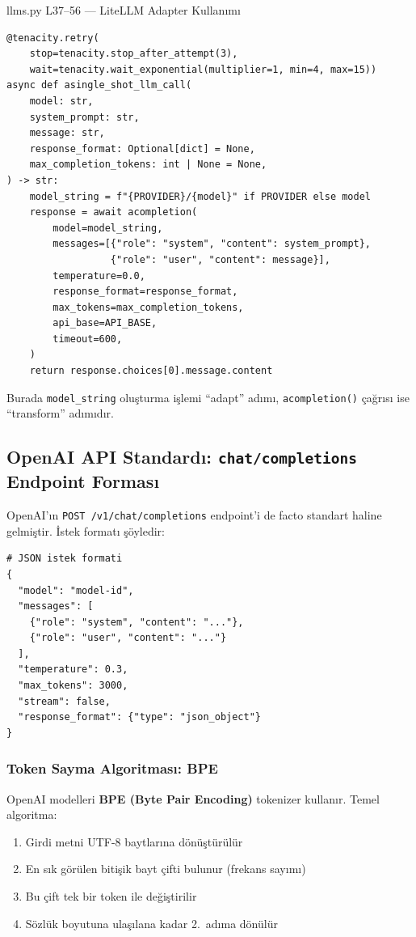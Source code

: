 \begin{kodref}{llms.py L37--56 --- LiteLLM Adapter Kullan{\i}m{\i}}
\begin{lstlisting}
@tenacity.retry(
    stop=tenacity.stop_after_attempt(3),
    wait=tenacity.wait_exponential(multiplier=1, min=4, max=15))
async def asingle_shot_llm_call(
    model: str,
    system_prompt: str,
    message: str,
    response_format: Optional[dict] = None,
    max_completion_tokens: int | None = None,
) -> str:
    model_string = f"{PROVIDER}/{model}" if PROVIDER else model
    response = await acompletion(
        model=model_string,
        messages=[{"role": "system", "content": system_prompt},
                  {"role": "user", "content": message}],
        temperature=0.0,
        response_format=response_format,
        max_tokens=max_completion_tokens,
        api_base=API_BASE,
        timeout=600,
    )
    return response.choices[0].message.content
\end{lstlisting}
\end{kodref}

Burada \texttt{model\_string} olu\c{s}turma i\c{s}lemi ``adapt'' ad{\i}m{\i}, \texttt{acompletion()} \c{c}a\u{g}r{\i}s{\i} ise ``transform'' ad{\i}m{\i}d{\i}r.


\subsection{OpenAI API Standard{\i}: \texttt{chat/completions} Endpoint Formas{\i}}
\label{sec:openai-api}

OpenAI'{\i}n \texttt{POST /v1/chat/completions} endpoint'i de facto standart haline gelmi\c{s}tir. \.{I}stek format{\i} \c{s}\"{o}yledir:

\begin{lstlisting}
# JSON istek formati
{
  "model": "model-id",
  "messages": [
    {"role": "system", "content": "..."},
    {"role": "user", "content": "..."}
  ],
  "temperature": 0.3,
  "max_tokens": 3000,
  "stream": false,
  "response_format": {"type": "json_object"}
}
\end{lstlisting}

\subsubsection{Token Sayma Algoritmas{\i}: BPE}

OpenAI modelleri \textbf{BPE (Byte Pair Encoding)} tokenizer kullan{\i}r. Temel algoritma:

\begin{enumerate}
  \item Girdi metni UTF-8 baytlar{\i}na d\"{o}n\"{u}\c{s}t\"{u}r\"{u}l\"{u}r
  \item En s{\i}k g\"{o}r\"{u}len biti\c{s}ik bayt \c{c}ifti bulunur (frekans say{\i}m{\i})
  \item Bu \c{c}ift tek bir token ile de\u{g}i\c{s}tirilir
  \item S\"{o}zl\"{u}k boyutuna ula\c{s}{\i}lana kadar 2.~ad{\i}ma d\"{o}n\"{u}l\"{u}r
\end{enumerate}

